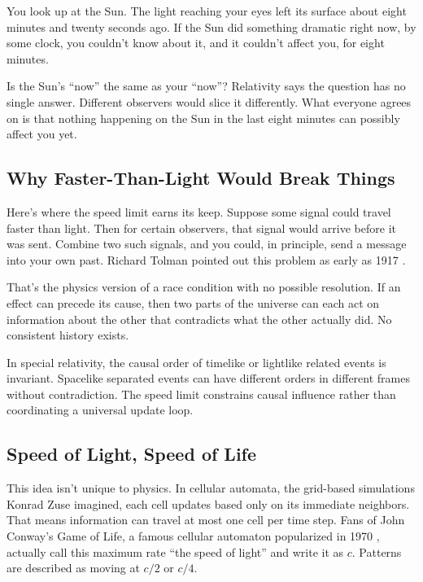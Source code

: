 \begin{examplebox}
You look up at the Sun. The light reaching your eyes left its surface about eight minutes and twenty seconds ago. If the Sun did something dramatic right now, by some clock, you couldn't know about it, and it couldn't affect you, for eight minutes.

Is the Sun's ``now'' the same as your ``now''? Relativity says the question has no single answer. Different observers would slice it differently. What everyone agrees on is that nothing happening on the Sun in the last eight minutes can possibly affect you yet.
\end{examplebox}

\subsection{Why Faster-Than-Light Would Break Things}

Here's where the speed limit earns its keep. Suppose some signal could travel faster than light. Then for certain observers, that signal would arrive before it was sent. Combine two such signals, and you could, in principle, send a message into your own past. Richard Tolman pointed out this problem as early as 1917 \cite{tolman1917}.

That's the physics version of a race condition with no possible resolution. If an effect can precede its cause, then two parts of the universe can each act on information about the other that contradicts what the other actually did. No consistent history exists.

In special relativity, the causal order of timelike or lightlike related events is invariant. Spacelike separated events can have different orders in different frames without contradiction. The speed limit constrains causal influence rather than coordinating a universal update loop.

\subsection{Speed of Light, Speed of Life}

This idea isn't unique to physics. In cellular automata, the grid-based simulations Konrad Zuse imagined, each cell updates based only on its immediate neighbors. That means information can travel at most one cell per time step. Fans of John Conway's Game of Life, a famous cellular automaton popularized in 1970 \cite{gardner1970}, actually call this maximum rate ``the speed of light'' and write it as \(c\). Patterns are described as moving at \(c/2\) or \(c/4\).

